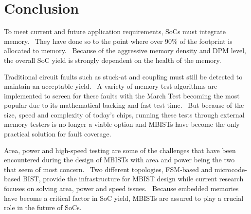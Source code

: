 \chapter{Conclusion}
\label{chap:conclusion}
To meet current and future application requirements, SoCs must integrate memory.  They have done so to the point where over 90\% of the footprint is allocated to memory.  Because of the aggressive memory density and DPM level, the overall SoC yield is strongly dependent on the health of the memory.  

Traditional circuit faults such as stuck-at and coupling must still be detected to maintain an acceptable yield.  A variety of memory test algorithms are implemented to screen for these faults with the March Test becoming the most popular due to its mathematical backing and fast test time.  But because of the size, speed and complexity of today’s chips, running these tests through external memory testers is no longer a viable option and MBISTs have become the only practical solution for fault coverage.  

Area, power and high-speed testing are some of the challenges that have been encountered during the design of MBISTs with area and power being the two that seem of most concern.  Two different topologies, FSM-based and microcode-based BIST, provide the infrastructure for MBIST design while current research focuses on solving area, power and speed issues.  Because embedded memories have become a critical factor in SoC yield, MBISTs are assured to play a crucial role in the future of SoCs.



